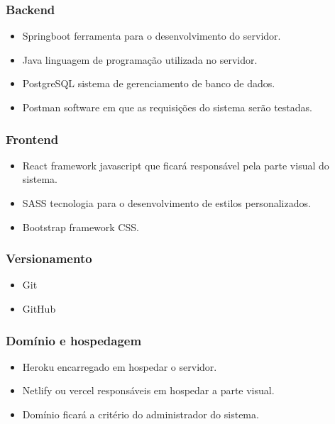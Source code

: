 \subsubsection{Backend}
\begin{itemize}
	\item Springboot ferramenta para o desenvolvimento do servidor.
	\item Java linguagem de programação utilizada no servidor.
	\item PostgreSQL sistema de gerenciamento de banco de dados.
	\item Postman software em que as requisições do sistema serão testadas.
\end{itemize}
\subsubsection{Frontend}
\begin{itemize}
	\item React framework javascript que ficará responsável pela parte visual do sistema.
	\item SASS tecnologia para o desenvolvimento de estilos personalizados.
	\item Bootstrap framework CSS.
\end{itemize}
\subsubsection{Versionamento}
\begin{itemize}
	\item Git
	\item GitHub
\end{itemize}
\subsubsection{Domínio e hospedagem}
\begin{itemize}
	\item Heroku encarregado em hospedar o servidor.
	\item Netlify ou vercel responsáveis em hospedar a parte visual.
	\item Domínio ficará a critério do administrador do sistema.
\end{itemize}

